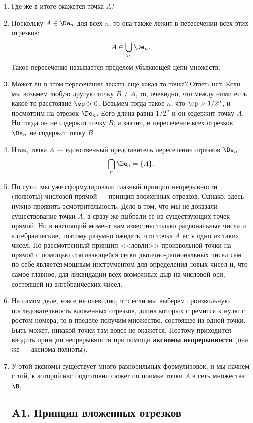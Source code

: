 \begin{enumerate}
\item Где же в итоге окажется точка $A$?
\item Поскольку $A\in\De_n$ для всех $n$, то она также лежит в пересечении всех этих отрезков:
$$
A\in\bigcup_n\De_n.
$$
Такое пересечение называется пределом убывающей цепи множеств.
\item Может ли в этом пересечении лежать еще какая-то точка? Ответ: нет. Если мы возьмем любую другую точку $B\ne A$, то, очевидно, что между ними есть какое-то расстояние $\ep>0$. Возьмем тогда такое $n$, что $\ep>1/2^n$, и посмотрим на отрезок $\De_n$. Еого длина равна $1/2^n$ и он содержит точку $A$. Но тогда он не содержит точку $B$, а значит, и пересечение всех отрезков $\De_n$ не содержит точку $B$.
\item Итак, точка $A$ --- единственный представитель пересечения отрезков $\De_n$:
$$
\bigcap_n\De_n = \{A\}.
$$
\item По сути, мы уже сформулировали главный принцип непрерывности (полноты) числовой прямой --- принцип вложенных отрезков. Однако, здесь нужно проявить осмотрительность. Дело в том, что мы не доказали существование точки $A$, а сразу же выбрали ее из существующих точек прямой. Но в настоящий момент нам известны только рациональные числа и алгебраические, поэтому разумно ожидать, что точка $A$ есть одно из таких чисел. Но рассмотренный принцип <<ловли>> произвольной точки на прямой с помощью стягивающейся сетки двоично-рациональных чисел сам по себе является мощным инструментом для определения новых чисел и, что самое главное, для ликвидации всех возможных дыр на числовой оси, состоящей из алгебраических чисел.





\item На самом деле, вовсе не очевидно, что если мы выберем произвольную последовательность вложенных отрезков, длина которых стремится к нулю с ростом номера, то в пределе получим множество, состоящее из одной точки. Быть может, никакой точки там вовсе не окажется. Поэтому приходится вводить принцип непрерывности при помощи \textbf{аксиомы непрерывности} (она же --- аксиома полноты).
\item У этой аксиомы существует много равносильных формулировок, и мы начнем с той, к которой нас подготовил сюжет по поимке точки $A$ в сеть множества $\B$.

\subsection*{A1. Принцип вложенных отрезков}




\end{enumerate}
